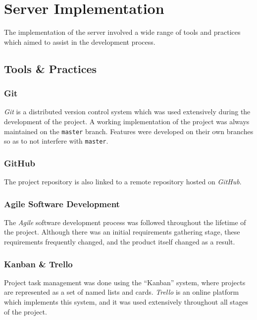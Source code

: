 \documentclass{l4proj}
\newcommand{\code}[1]{\texttt{#1}}
\begin{document}

\section{Server Implementation}

The implementation of the server involved a wide range of tools and practices which aimed to assist in the development process.

    \subsection{Tools \& Practices}
    
             \subsubsection{Git}
         \textit{Git} is a distributed version control system which was used extensively during the development of the project. A working implementation of the project was always maintained on the \code{master} branch. Features were developed on their own branches so as to not interfere with \code{master}.
         
             \subsubsection{GitHub}
             The project repository is also linked to a remote repository hosted on \textit{GitHub}.
             
             \subsubsection{Agile Software Development}
             The \textit{Agile} software development process was followed throughout the lifetime of the project. Although there was an initial requirements gathering stage, these requirements frequently changed, and the product itself changed as a result.
             
             
             \subsubsection{Kanban \& Trello}
             Project task management was done using the ``Kanban'' system, where projects are represented as a set of named lists and cards. \textit{Trello} is an online platform which implements this system, and it was used extensively throughout all stages of the project.
         
\end{document}
